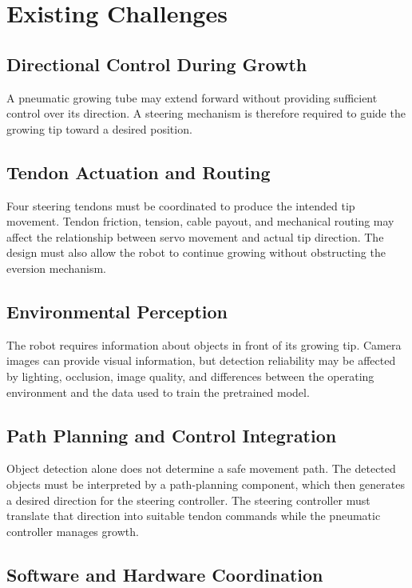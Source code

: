 \section{Existing Challenges}

\subsection{Directional Control During Growth}

A pneumatic growing tube may extend forward without providing sufficient control over its direction. A steering mechanism is therefore required to guide the growing tip toward a desired position.

\subsection{Tendon Actuation and Routing}

Four steering tendons must be coordinated to produce the intended tip movement. Tendon friction, tension, cable payout, and mechanical routing may affect the relationship between servo movement and actual tip direction. The design must also allow the robot to continue growing without obstructing the eversion mechanism.

\subsection{Environmental Perception}

The robot requires information about objects in front of its growing tip. Camera images can provide visual information, but detection reliability may be affected by lighting, occlusion, image quality, and differences between the operating environment and the data used to train the pretrained model.

\subsection{Path Planning and Control Integration}

Object detection alone does not determine a safe movement path. The detected objects must be interpreted by a path-planning component, which then generates a desired direction for the steering controller. The steering controller must translate that direction into suitable tendon commands while the pneumatic controller manages growth.

\subsection{Software and Hardware Coordination}

